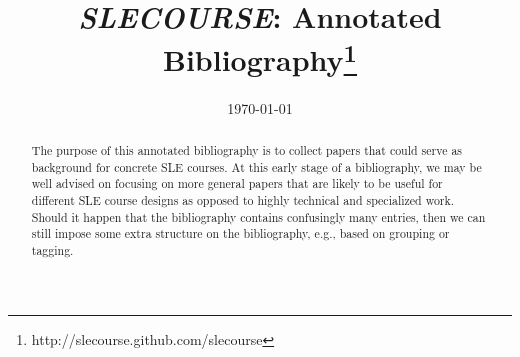 \documentclass[12pt]{article}
\begin{document}
\title{\emph{SLECOURSE}: Annotated Bibliography\thanks{http://slecourse.github.com/slecourse}}

\date{\today}

\maketitle

\begin{abstract}
The purpose of this annotated bibliography is to collect papers that could serve as background for concrete SLE courses. At this early stage of a bibliography, we may be well advised on focusing on more general papers that are likely to be useful for different SLE course designs as opposed to highly technical and specialized work. Should it happen that the bibliography contains confusingly many entries, then we can still impose some extra structure on the bibliography, e.g., based on grouping or tagging.
\end{abstract}

\nocite{*}



\end{document}
